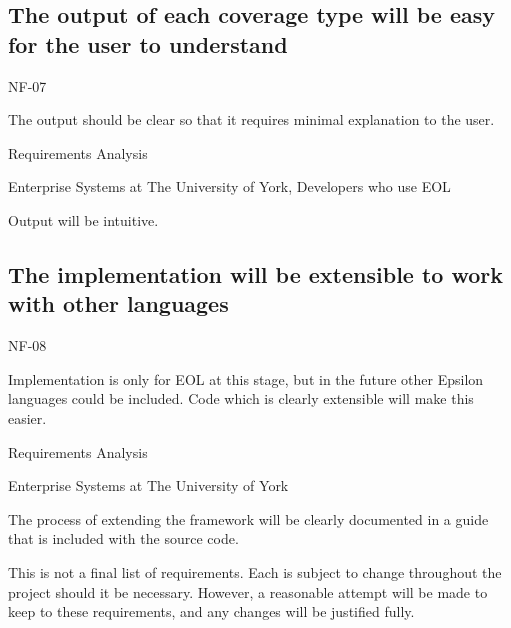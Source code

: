 \subsection{The output of each coverage type will be easy for the user to understand}
\begin{description}[style=sameline,leftmargin=4.5cm,nolistsep]
\item[\hspace*{0.3cm}Label] NF-07
\item[\hspace*{0.3cm}Description] The output should be clear so that it requires minimal explanation to the user.
\item[\hspace*{0.3cm}Source] Requirements Analysis
\item[\hspace*{0.3cm}Stakeholders] Enterprise Systems at The University of York, Developers who use EOL
\item[\hspace*{0.3cm}Satisfiable Conditions] Output will be intuitive.
\end{description}

\subsection{The implementation will be extensible to work with other languages}
\begin{description}[style=sameline,leftmargin=4.5cm,nolistsep]
\item[\hspace*{0.3cm}Label] NF-08
\item[\hspace*{0.3cm}Description] Implementation is only for EOL at this stage, but in the future other Epsilon languages could be included. Code which is clearly extensible will make this easier.
\item[\hspace*{0.3cm}Source] Requirements Analysis
\item[\hspace*{0.3cm}Stakeholders] Enterprise Systems at The University of York
\item[\hspace*{0.3cm}Satisfiable Conditions] The process of extending the framework will be clearly documented in a guide that is included with the source code.
\end{description}

This is not a final list of requirements. Each is subject to change throughout the project should it be necessary. However, a reasonable attempt will be made to keep to these requirements, and any changes will be justified fully.